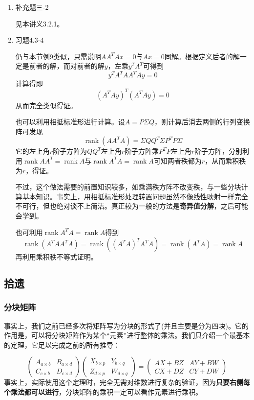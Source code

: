 \documentclass[a4paper,UTF8,fontset=windows]{ctexart}
\DeclareMathOperator{\rank}{rank}
\newcommand*{\note}{\noindent *}
\begin{document}
\begin{enumerate}
    \item 补充题三-2
    
    见本讲义3.2.1。

    \item 习题4.3-4
    
    仍与本节例9类似，只需说明$AA^TAx=0$与$Ax=0$同解。根据定义后者的解一定是前者的解，而对前者的解$y$，左乘$y^TA^T$可得到
    $$y^TA^TAA^TAy=0$$
    计算得即
    $$(A^TAy)^T(A^TAy)=0$$
    从而完全类似得证。

    \note 也可以利用相抵标准形进行计算。设$A=P\Sigma Q$，则计算后消去两侧的行列变换阵可发现
    $$\rank(AA^TA)=\Sigma QQ^T\Sigma P^TP\Sigma$$
    它的左上角$r$阶子方阵为$QQ^T$左上角$r$阶子方阵乘$P^TP$左上角$r$阶子方阵，分别利用$\rank AA^T=\rank A$与$\rank A^TA=\rank A$可知两者秩都为$r$，从而乘积秩为$r$，得证。

    不过，这个做法需要的前置知识较多，如乘满秩方阵不改变秩，与一些分块计算基本知识。事实上，用相抵标准形处理转置问题虽然不像线性映射一样完全不可行，但也绝对谈不上简洁。真正较为一般的方法是\textbf{奇异值分解}，之后可能会学到。

    \note 也可利用$\rank A^TA=\rank A$得到
    $$\rank(A^TAA^TA)=\rank((A^TA)^TA^TA)=\rank(A^TA)=\rank A$$
    再利用乘积秩不等式证明。

\end{enumerate}
\subsection{拾遗}
\subsubsection{分块矩阵}
事实上，我们之前已经多次将矩阵写为分块的形式了(并且主要是分为四块)。它的作用是，可以将分块矩阵作为某个``元素''进行整体的乘法。我们只介绍一个最基本的定理，它足以完成之前的所有推导：

$$\begin{pmatrix}A_{a\times b}&B_{a\times d}\\C_{c\times b}&D_{c\times d}\end{pmatrix}\begin{pmatrix}X_{b\times p}&Y_{b\times q}\\Z_{d\times p}&W_{d\times q}\end{pmatrix}=\begin{pmatrix}AX+BZ&AY+BW\\CX+DZ&CY+DW\end{pmatrix}$$
事实上，实际使用这个定理时，完全无需对维数进行复杂的验证，因为\textbf{只要右侧每个乘法都可以进行}，分块矩阵的乘积一定可以看作元素进行乘积。
\end{document}
